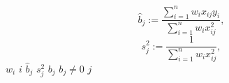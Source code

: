\documentclass{article}
\begin{document}
$$
\hat{b}_j := \frac{\sum_{i=1}^n w_{i} x_{ij} y_i}{\sum_{i=1}^n w_{i} x_{ij}^2},
$$
$$
s^2_j := \frac{1}{\sum_{i=1}^n w_i x_{ij}^2},
$$
$w_{i}$
$i$
$\hat{b}_j$
$s_j^2$
$b_j$
$b_j \neq 0$
$j$
\end{document}
